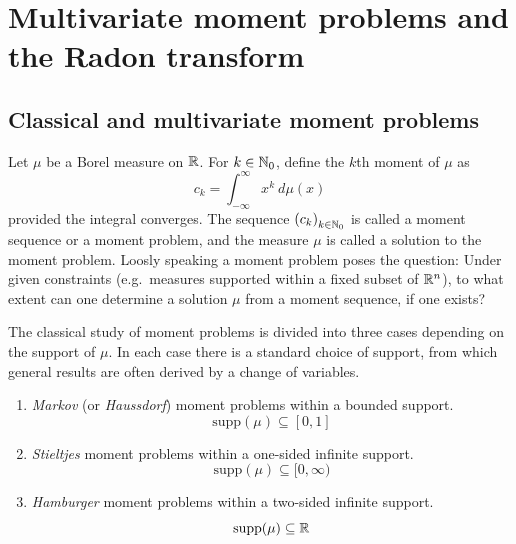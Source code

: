 

\chapter{Multivariate moment problems and the Radon transform}{}

\section{Classical and multivariate moment problems}
Let $\mu$ be a Borel measure on $\mathbb{R}$. For $k \in \mathbb{N}_0$, define the $k$th moment of $\mu$ as
\[
  c_k = \int_{-\infty}^\infty x^k ~d\mu(x)
\]
provided the integral converges. The sequence ${(c_k)}_{k \in \mathbb{N}_0}$ is called a moment sequence or a moment problem, and the measure $\mu$ is called a solution to the moment problem. Loosly speaking a moment problem poses the question: Under given constraints (e.g.\ measures supported within a fixed subset of $\mathbb{R}^n$), to what extent can one determine a solution $\mu$ from a moment sequence, if one exists? 

The classical study of moment problems is divided into three cases depending on the support of $\mu$. In each case there is a standard choice of support, from which general results are often derived by a change of variables.
\begin{enumerate}[label=]
  \item \emph{Markov} (or \emph{Haussdorf}) moment problems within a bounded support.
  \[
    \text{supp}(\mu) \subseteq [0,1]
  \]
  \item \emph{Stieltjes} moment problems within a one-sided infinite support. 
  \[
    \text{supp}(\mu) \subseteq [0,\infty)
  \]
  \item \emph{Hamburger} moment problems within a two-sided infinite support.
  \[
    \text{supp}(\mu) \subseteq \mathbb{R}
  \]
\end{enumerate}

